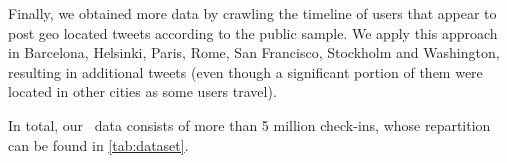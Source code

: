 Finally, we obtained more data by crawling the timeline of users that appear to
post geo located tweets according to the public sample. We apply this approach
in Barcelona, Helsinki, Paris, Rome, San Francisco, Stockholm and Washington,
resulting in  additional tweets (even though a significant
portion of them were located in other cities as some users travel).

In total, our \fs\ data consists of more than 5 million check-ins, whose
repartition can be found in \autoref{tab:dataset}.


\begin{table}[ht]
  \small
  \setlength{\tabcolsep}{5pt}
	\centering
	

\end{table}
